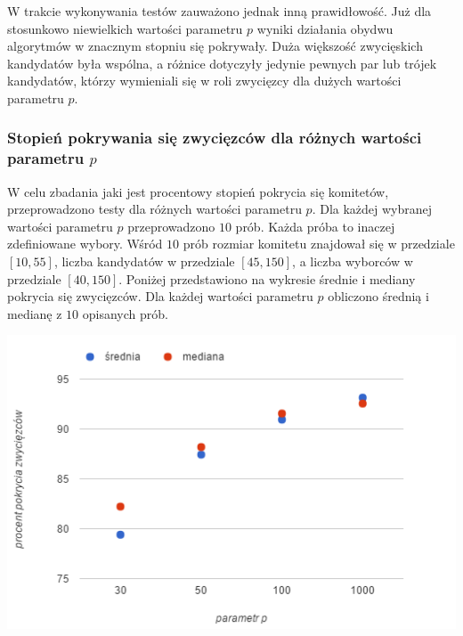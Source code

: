 \documentclass[polish,11pt]{aghthesis}
\begin{document}
\noindent W trakcie wykonywania testów zauważono jednak inną prawidłowość. Już dla stosunkowo niewielkich wartości parametru $p$ wyniki działania obydwu algorytmów w znacznym stopniu się pokrywały. Duża większość zwycięskich kandydatów była wspólna, a różnice dotyczyły jedynie pewnych par lub trójek kandydatów, którzy wymieniali się w roli zwycięzcy dla dużych wartości parametru $p$.

\subsubsection{Stopień pokrywania się zwycięzców dla różnych wartości parametru $p$}
W celu zbadania jaki jest procentowy stopień pokrycia się komitetów, przeprowadzono testy dla różnych wartości parametru $p$. Dla każdej wybranej wartości parametru $p$ przeprowadzono $10$ prób. Każda próba to inaczej zdefiniowane wybory. Wśród $10$ prób rozmiar komitetu znajdował się w przedziale $[10, 55]$, liczba kandydatów w przedziale $[45, 150]$, a liczba wyborców w przedziale $[40, 150]$. Poniżej przedstawiono na wykresie średnie i mediany pokrycia się zwycięzców. Dla każdej wartości parametru $p$ obliczono średnią i medianę z $10$ opisanych prób. 
\newpage

\begin{center}
\centerline{\includegraphics[scale=1]{pics/srednia_mediana_od_parametr_p.png}}
\end{center}
\end{document}
